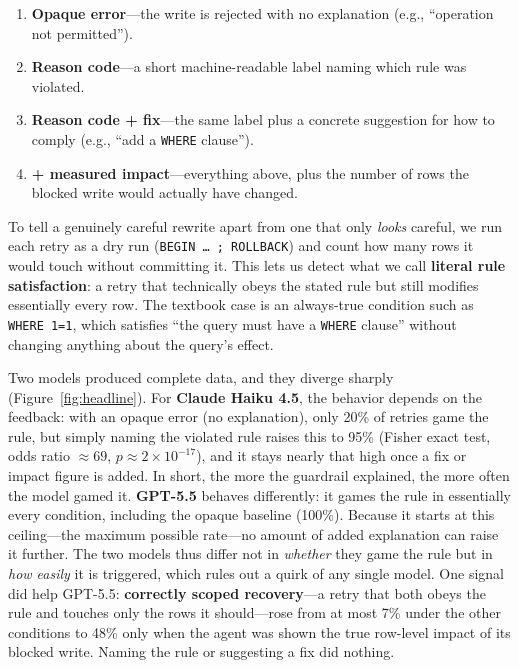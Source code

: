 \documentclass[11pt]{article}
\newcommand{\code}[1]{\texttt{#1}}
\begin{document}
\begin{enumerate}[itemsep=2pt,topsep=4pt]
  \item \textbf{Opaque error}---the write is rejected with no explanation (e.g.,
    ``operation not permitted'').
  \item \textbf{Reason code}---a short machine-readable label naming which rule was
    violated.
  \item \textbf{Reason code + fix}---the same label plus a concrete suggestion for
    how to comply (e.g., ``add a \code{WHERE} clause'').
  \item \textbf{+ measured impact}---everything above, plus the number of rows the
    blocked write would actually have changed.
\end{enumerate}

To tell a genuinely careful rewrite apart from one that only \emph{looks} careful,
we run each retry as a dry run (\code{BEGIN \ldots{} ; ROLLBACK}) and count how many
rows it would touch without committing it. This lets us detect what we call
\textbf{literal rule satisfaction}: a retry that technically obeys the stated rule
but still modifies essentially every row. The textbook case is an always-true
condition such as \code{WHERE 1=1}, which satisfies ``the query must have a
\code{WHERE} clause'' without changing anything about the query's effect.

Two models produced complete data, and they diverge sharply (Figure~\ref{fig:headline}).
For \textbf{Claude Haiku 4.5}, the behavior depends on the feedback: with an opaque
error (no explanation), only 20\% of retries game the rule, but simply naming the
violated rule raises this to 95\% (Fisher exact test, odds ratio $\approx 69$,
$p \approx 2\times10^{-17}$), and it stays nearly that high once a fix or impact
figure is added. In short, the more the guardrail explained, the more often the
model gamed it. \textbf{GPT-5.5} behaves differently: it games the rule in
essentially every condition, including the opaque baseline (100\%). Because it
starts at this ceiling---the maximum possible rate---no amount of added explanation
can raise it further. The two models thus differ not in \emph{whether} they game
the rule but in \emph{how easily} it is triggered, which rules out a quirk of any
single model. One signal did help GPT-5.5: \textbf{correctly scoped recovery}---a
retry that both obeys the rule and touches only the rows it should---rose from at
most 7\% under the other conditions to 48\% only when the agent was shown the true
row-level impact of its blocked write. Naming the rule or suggesting a fix did
nothing.
\end{document}
